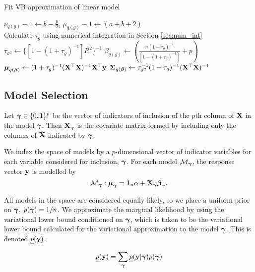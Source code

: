 \documentclass{amsart}[12pt]
\begin{document}
\begin{algorithm}
	\caption{Fit VB approximation of linear model}
	\label{alg:algorithm_two}
	\begin{algorithmic}
		\REQUIRE $\nu_{q(g)} - 1 \leftarrow b - \frac{p}{2}$, $\mu_{q(g)} - 1 \leftarrow (a + b + 2)$ \\
		\STATE Calculate $\tau_{g}$ using numerical integration in Section \ref{sec:num_int}
		\ENDWHILE
		\STATE $\tau_{\sigma^2} \leftarrow \{[1 - (1 + \tau_g)^{-1}] R^2\}^{-1}$
		\STATE $\beta_{q(g)} \leftarrow \left(\frac{n (1 + \tau_g)^{-1}}{[1 - (1 + \tau_g)^{-1}]} + p \right)$
		\STATE ${\boldsymbol \mu}_{q({\boldsymbol \beta})} \leftarrow (1 + \tau_g)^{-1} ({\bf X}^\top {\bf X})^{-1} {\bf X}^\top {\bf y}$
		\STATE ${\boldsymbol \Sigma}_{q({\boldsymbol \beta})} \leftarrow \tau_{\sigma^2}^{-1} (1 + \tau_{g})^{-1}({\bf X}^\top {\bf X})^{-1}$
	\end{algorithmic}
\end{algorithm}

\subsection{Model Selection}
\label{sec:model_selection}

Let ${\boldsymbol \gamma} \in \{0, 1\}^p$ be the vector of indicators of inclusion of the $p$th column of ${\bf X}$ in the
model ${\boldsymbol \gamma}$. Then ${\bf X}_{\boldsymbol \gamma}$ is the covariate matrix formed by including only the columns of ${\bf X}$
indicated by ${\boldsymbol \gamma}$.

We index the space of models by a $p$-dimensional vector of indicator variables for each variable considered 
for inclusion, ${\boldsymbol \gamma}$. For each model $\mathcal{M}_{\boldsymbol \gamma}$, the response vector ${\bf y}$ is modelled by
\begin{equation*}
	\mathcal{M}_{\boldsymbol \gamma}: {\boldsymbol \mu}_{\boldsymbol \gamma} = {\bf 1}_n \alpha + {\bf X}_{\boldsymbol \gamma} {\boldsymbol \beta}_{\boldsymbol \gamma}.
\end{equation*}


All models in the space are considered equally likely, so we place a uniform prior on ${\boldsymbol \gamma}$, $p({\boldsymbol \gamma}) =
1/n$. We approximate the marginal likelihood by using the variational lower bound conditioned on ${\boldsymbol \gamma}$,
which is taken to be the variational lower bound calculated for the variational approximation to the model
${\boldsymbol \gamma}$. This is denoted $\underline{p}({\bf y})$. 

$$\underline{p}({\bf y}) = \sum_{\boldsymbol \gamma} \underline{p}({\bf y}|{\boldsymbol \gamma}) p({\boldsymbol \gamma})$$
\end{document}
